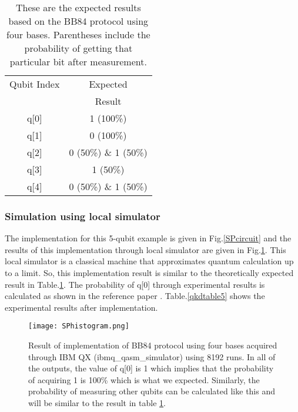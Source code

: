 \documentclass[superscriptaddress,twocolumn,showpacs,prb,floatfix]{revtex4}
\begin{document}
\begin{table}[ht]
    \centering
    \begin{tabular}{|c|c|}
    \hline\hline
    Qubit Index & Expected\\ & Result  \\ [0.5ex]
    \hline
    q[0] & 1 (100\%)\\[0.5ex]
    \hline
    q[1] & 0 (100\%) \\[0.5ex]
    \hline
    q[2] & 0 (50\%) \& 1 (50\%) \\[0.5ex]
    \hline
    q[3] & 1 (50\%) \\[0.5ex]
    \hline
    q[4] & 0 (50\%) \& 1 (50\%) \\[0.5ex]
     \hline
    \end{tabular}
    \caption{These are the expected results based on the BB84 protocol using four bases. Parentheses include the probability of getting that particular bit after measurement.}
    \label{qkdtable3}
\end{table}

\subsubsection{Simulation using local simulator}
\label{SecIIAi} 

The implementation for this 5-qubit example is given in Fig.\ref{SPcircuit} and the results of this implementation through local simulator are given in Fig.\ref{SPhistogram}. This local simulator is a classical machine that approximates quantum calculation up to a limit. So, this implementation result is similar to the theoretically expected result in Table.\ref{qkdtable3}. The probability of q[0] through experimental results is calculated as shown in the reference paper \cite{MKAAANICCAIS2019}. Table.\ref{qkdtable5} shows the experimental results after implementation.

\begin{figure}[H]
    \centering
    \texttt{[image: SPhistogram.png]}
    \caption{Result of implementation of BB84 protocol using four bases acquired through IBM QX (ibmq\_qasm\_simulator) using 8192 runs. In all of the outputs, the value of q[0] is 1 which implies that the probability of acquiring 1 is 100\% which is what we expected. Similarly, the probability of measuring other qubits can be calculated like this and will be similar to the result in table \ref{qkdtable3}.}
    \label{SPhistogram}
\end{figure}
\end{document}
